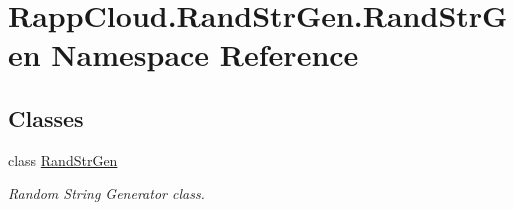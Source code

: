 \hypertarget{namespaceRappCloud_1_1RandStrGen_1_1RandStrGen}{\section{Rapp\-Cloud.\-Rand\-Str\-Gen.\-Rand\-Str\-Gen Namespace Reference}
\label{namespaceRappCloud_1_1RandStrGen_1_1RandStrGen}
}
\subsection*{Classes}
\begin{DoxyCompactItemize}
\item 
class \hyperlink{classRappCloud_1_1RandStrGen_1_1RandStrGen_1_1RandStrGen}{Rand\-Str\-Gen}
\begin{DoxyCompactList}\small\item\em Random String Generator class. \end{DoxyCompactList}\end{DoxyCompactItemize}
